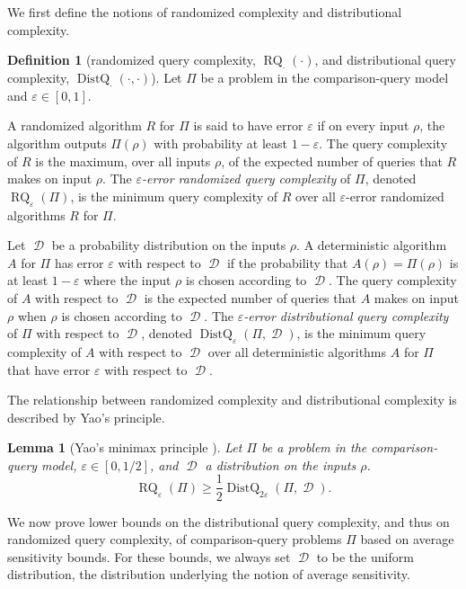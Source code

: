 \documentclass[11pt]{article}
\numberwithin{equation}{section}
\newtheorem{lemma}[theorem]{Lemma}
\theoremstyle{definition}
\newtheorem{definition}[theorem]{Definition}
\theoremstyle{plain}
\newcommand{\ranking}{\rho}
\DeclareMathOperator{\dist}{\mathcal{D}}
\DeclareMathOperator{\DistQ}{DistQ}
\DeclareMathOperator{\RQ}{RQ}
\newcommand{\eps}{\varepsilon}
\begin{document}
We first define the notions of randomized complexity and distributional complexity.

\begin{definition}[randomized query complexity, $\RQ_{\cdot}(\cdot)$, and distributional query complexity, $\DistQ_\cdot(\cdot, \cdot)$]
Let $\Pi$ be a problem in the comparison-query model and $\eps \in [0,1]$.

A randomized algorithm $R$ for $\Pi$ is said to have error $\eps$ if on every input $\ranking$, the algorithm outputs $\Pi(\ranking)$ with probability at least $1-\eps$. The query complexity of $R$ is the maximum, over all inputs $\ranking$, of the expected number of queries that $R$ makes on input $\ranking$. The \emph{$\eps$-error randomized query complexity} of $\Pi$, denoted $\RQ_{\eps}(\Pi)$, is the minimum query complexity of $R$ over all $\eps$-error randomized algorithms $R$ for $\Pi$.

Let $\dist$ be a probability distribution on the inputs $\ranking$. A deterministic algorithm $A$ for $\Pi$ has error $\eps$ with respect to $\dist$ if the probability that $A(\ranking)=\Pi(\ranking)$ is at least $1-\eps$ where the input $\ranking$ is chosen according to $\dist$. The query complexity of $A$ with respect to $\dist$ is the expected number of queries that $A$ makes on input $\ranking$ when $\ranking$ is chosen according to $\dist$. The \emph{$\eps$-error distributional query complexity} of $\Pi$ with respect to $\dist$, denoted $\DistQ_{\eps}(\Pi,\dist)$, is the minimum query complexity of $A$ with respect to $\dist$ over all deterministic algorithms $A$ for $\Pi$ that have error $\eps$ with respect to $\dist$.
\end{definition}

The relationship between randomized complexity and distributional complexity is described by Yao's principle. 

\begin{lemma}[Yao's minimax principle \cite{Yao77}]
	\label{lemma:yaos-principle}
	Let $\Pi$ be a problem in the comparison-query model, $\eps \in [0,1/2]$, and $\dist$ a distribution on the inputs $\ranking$.
	\begin{equation}\label{eq:yao}
	\RQ_{\eps}(\Pi) \ge \frac{1}{2}\DistQ_{2\eps}(\Pi, \dist). 
	\end{equation}
\end{lemma}

We now prove lower bounds on the distributional query complexity, and thus on randomized query complexity, of comparison-query problems $\Pi$ based on average sensitivity bounds. For these bounds, we always set $\dist$ to be the uniform distribution, the distribution underlying the notion of average sensitivity. 
\end{document}
